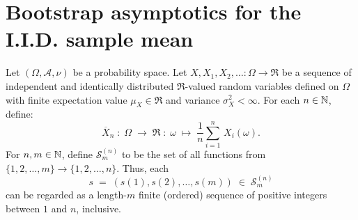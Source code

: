 
\newcommand{\Wpo}{\mathcal{W}^{p}_{1}}
\newcommand{\Wto}{\mathcal{W}^{2}_{1}\!\left(\Re,\mathcal{B}(\Re)\right)}
\newcommand{\Wt}{W_{2}}
\newcommand{\MoR}{\mathcal{M}_{1}(\Re,\mathcal{B}(\Re))}


\section{Bootstrap asymptotics for the I.I.D. sample mean}
\setcounter{theorem}{0}
\setcounter{equation}{0}

\newcommand{\Snm}{\mathcal{S}^{(n)}_{m}}
\newcommand{\Xnm}{\overline{X}^{(n)}_{m}}

\begin{theorem}
\mbox{}\vskip 0.1cm
\noindent
Let $\left(\Omega,\mathcal{A},\nu\right)$ be a probability space.
Let $X, X_{1}, X_{2}, \ldots : \Omega \longrightarrow \Re$ be a sequence
of independent and identically distributed $\Re$-valued random variables
defined on $\Omega$
{\color{red}with finite expectation value $\mu_{X} \in \Re$ and variance $\sigma^{2}_{X} < \infty$}.
For each $n \in \mathbb{N}$, define:
\begin{equation*}
\overline{X}_{n} \;:\; \Omega \; \longrightarrow \; \Re \;:\; \omega \; \longmapsto \; \dfrac{1}{n}\sum^{n}_{i=1}\,X_{i}(\omega).
\end{equation*}
For $n, m \in \mathbb{N}$, define $\Snm$ to be the set of all functions from $\{1,2,\ldots,m\} \longrightarrow \{1,2,\ldots,n\}$.
Thus, each
\begin{equation*}
s \; = \; \left(s(1), s(2), \ldots, s(m) \right) \;\in\; \Snm
\end{equation*}
can be regarded as a length-$m$ finite (ordered) sequence of positive integers between $1$ and $n$, inclusive.

\end{theorem}

